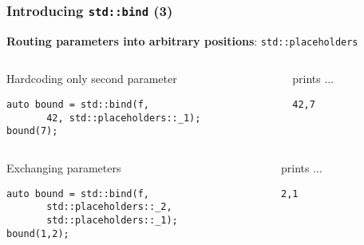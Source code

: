\begin{frame}[fragile]
  \frametitle{Introducing \texttt{std::bind} (3)}

  \textbf{Routing parameters into arbitrary positions}:
  \texttt{std::placeholders}

  \begin{columns}[t]

    \begin{column}{.6\textwidth}
      \begin{block}{Hardcoding only second parameter}
\begin{verbatim}
auto bound = std::bind(f, 
       42, std::placeholders::_1);
bound(7);
\end{verbatim}
      \end{block}
    \end{column}

    \begin{column}{.3\textwidth}
      \begin{block}{prints ...}
\begin{verbatim}
42,7
\end{verbatim}
      \end{block}
    \end{column}

  \end{columns}

  \begin{columns}[t]

    \begin{column}{.6\textwidth}
      \begin{block}{Exchanging parameters}
\begin{verbatim}
auto bound = std::bind(f, 
       std::placeholders::_2, 
       std::placeholders::_1);
bound(1,2);
\end{verbatim}
      \end{block}
    \end{column}

    \begin{column}{.3\textwidth}
      \begin{block}{prints ...}
\begin{verbatim}
2,1
\end{verbatim}
      \end{block}
    \end{column}

  \end{columns}

\end{frame}

